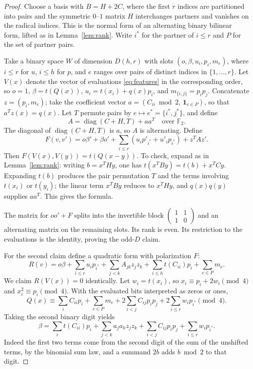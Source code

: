 \documentclass[11pt]{article}
\newcommand{\F}{\mathbb F_2}
\begin{document}
\begin{proof}
Choose a basis with $B=H+2C$, where the first $r$ indices are partitioned into pairs and the symmetric $0$--$1$ matrix $H$ interchanges partners and vanishes on the radical indices. This is the normal form of an alternating binary bilinear form, lifted as in Lemma~\ref{lem:rank}. Write $i^*$ for the partner of $i\le r$ and $P$ for the set of partner pairs.

Take a binary space $W$ of dimension $D(h,r)$ with slots $(o,\beta,u_i,p_i,m_e)$, where $i\le r$ for $u$, $i\le h$ for $p$, and $e$ ranges over pairs of distinct indices in $\{1,\ldots,r\}$. Let $V(x)$ denote the vector of evaluations \eqref{eq:features} in the corresponding order, so $o=1$, $\beta=t(Q(x))$, $u_i=t(x_i)+q(x)p_i$, and $m_{\{i,j\}}=p_ip_j$. Concatenate $z=(p_i,m_e)$; take the coefficient vector $a=(C_{ii}\bmod2,\,\mathbf1_{e\in P})$, so that $a^Tz(x)=q(x)$. Let $T$ permute pairs by $e\mapsto e^*=\{i^*,j^*\}$, and define
\[
 A=\operatorname{diag}(C+H,T)+aa^T\quad\text{over }\F.
\]
The diagonal of $\operatorname{diag}(C+H,T)$ is $a$, so $A$ is alternating. Define
\[
 F(v,v')=o\beta'+\beta o'+\sum_{i\le r}(u_i p'_{i^*}+u'_i p_{i^*})+z^TAz'.
\]
Then $F(V(x),V(y))=t(Q(x-y))$. To check, expand as in Lemma~\ref{lem:rank}: writing $b=x^THy$, one has $t(x^TBy)=t(b)+x^TCy$. Expanding $t(b)$ produces the pair permutation $T$ and the terms involving $t(x_i)$ or $t(y_i)$; the linear term $x^TBy$ reduces to $x^THy$, and $q(x)q(y)$ supplies $aa^T$. This gives the formula.

The matrix for $oo'+F$ splits into the invertible block $\left(\begin{smallmatrix}1&1\\1&0\end{smallmatrix}\right)$ and an alternating matrix on the remaining slots. Its rank is even. Its restriction to the evaluations is the identity, proving the odd-$D$ claim.

For the second claim define a quadratic form with polarization $F$:
\begin{equation}\label{eq:R}
 R(v)=o\beta+\sum_{i\le r}u_i p_{i^*}+\sum_{j<k}A_{jk}z_jz_k
      +\sum_{i\le h} t(C_{ii})p_i+\sum_{e\in P}m_e .
\end{equation}
We claim $R(V(x))=0$ identically. Let $w_i=t(x_i)$, so $x_i\equiv p_i+2w_i\pmod4$ and $x_i^2\equiv p_i\pmod4$. With the evaluated bits interpreted as zeros or ones,
\[
 Q(x)\equiv\sum_i C_{ii}p_i+\sum_{e\in P}m_e
       +2\sum_{i<j}C_{ij}p_ip_j+2\sum_{i\le r}w_i p_{i^*}\pmod4.
\]
Taking the second binary digit yields
\begin{equation}\label{eq:beta}
 \beta=\sum_i t(C_{ii})p_i+\sum_{j<k}a_j a_k z_jz_k
       +\sum_{i<j} C_{ij}p_ip_j+\sum_{i\le r}w_i p_{i^*}.
\end{equation}
Indeed the first two terms come from the second digit of the sum of the unshifted terms, by the binomial sum law, and a summand $2b$ adds $b\bmod2$ to that digit.


\end{proof}
\end{document}
